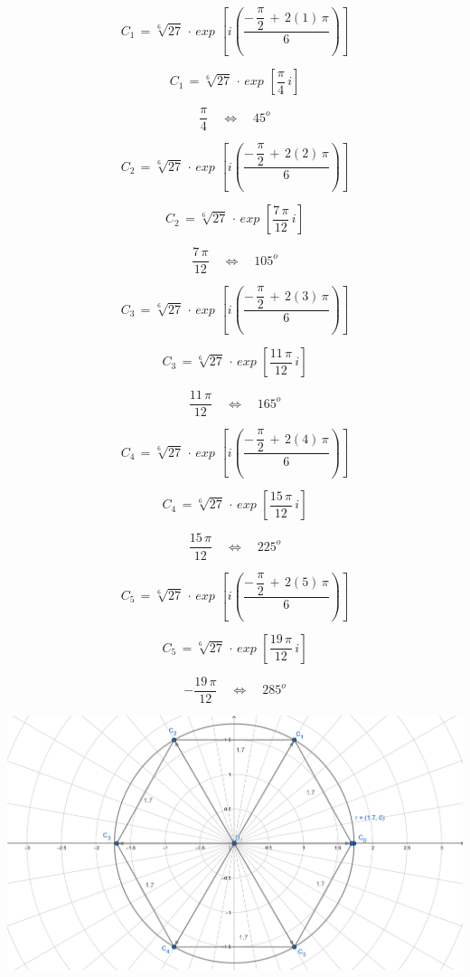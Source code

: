 \documentclass[a4paper,11pt,openany]{book}
\begin{document}
\textcolor{ao(english)}{}

$$C_1\,=\sqrt[6]{27}\,\cdot\,exp\,{\,\left[i\left(  \dfrac{-\,\dfrac{\pi}{2}\,+\,2(1)\,\pi}{6}\right)\right]}$$

$$C_1\,=\sqrt[6]{27}\,\cdot\,exp\,{\,\left[\dfrac{\pi}{4}\,i\right]}$$

$$\dfrac{\pi}{4} \quad\iff\quad \boxed{45^{o}}$$

\textcolor{ao(english)}{}

$$C_2\,=\sqrt[6]{27}\,\cdot\,exp\,{\,\left[i\left(  \dfrac{-\,\dfrac{\pi}{2}\,+\,2(2)\,\pi}{6}\right)\right]}$$

$$C_2\,=\sqrt[6]{27}\,\cdot\,exp\,{\,\left[\dfrac{7\,\pi}{12}\,i\right]}$$

$$\dfrac{7\,\pi}{12} \quad\iff\quad \boxed{105^{o}}$$

\textcolor{ao(english)}{}

$$C_3\,=\sqrt[6]{27}\,\cdot\,exp\,{\,\left[i\left(  \dfrac{-\,\dfrac{\pi}{2}\,+\,2(3)\,\pi}{6}\right)\right]}$$

$$C_3\,=\sqrt[6]{27}\,\cdot\,exp\,{\,\left[\dfrac{11\,\pi}{12}\,i\right]}$$

$$\dfrac{11\,\pi}{12} \quad\iff\quad \boxed{165^{o}}$$

\textcolor{ao(english)}{}

$$C_4\,=\sqrt[6]{27}\,\cdot\,exp\,{\,\left[i\left(  \dfrac{-\,\dfrac{\pi}{2}\,+\,2(4)\,\pi}{6}\right)\right]}$$

$$C_4\,=\sqrt[6]{27}\,\cdot\,exp\,{\,\left[\dfrac{15\,\pi}{12}\,i\right]}$$

$$\dfrac{15\,\pi}{12} \quad\iff\quad \boxed{225^{o}}$$

\textcolor{ao(english)}{}

$$C_5\,=\sqrt[6]{27}\,\cdot\,exp\,{\,\left[i\left(  \dfrac{-\,\dfrac{\pi}{2}\,+\,2(5)\,\pi}{6}\right)\right]}$$

$$C_5\,=\sqrt[6]{27}\,\cdot\,exp\,{\,\left[\dfrac{19\,\pi}{12}\,i\right]}$$

$$-\dfrac{19\,\pi}{12} \quad\iff\quad \boxed{285^{o}}$$

\includegraphics[width=15cm]{Gra-Ej-10}
\end{document}

